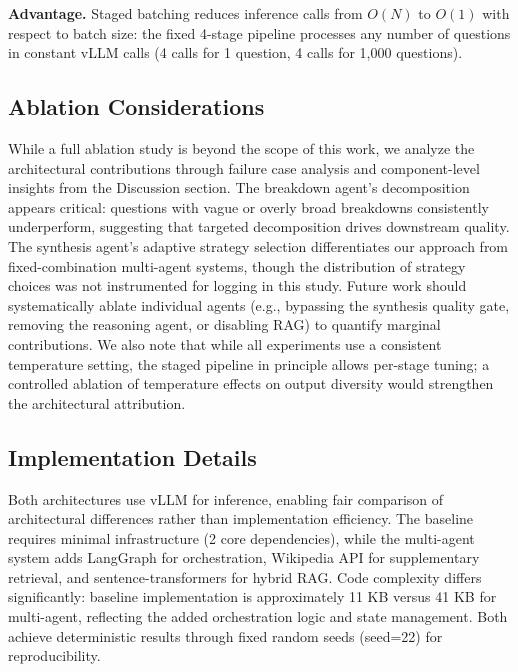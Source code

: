 \textbf{Advantage.} Staged batching reduces inference calls from $O(N)$ to $O(1)$ with respect to batch size: the fixed 4-stage pipeline processes any number of questions in constant vLLM calls (4 calls for 1 question, 4 calls for 1,000 questions).

\subsection{Ablation Considerations}

While a full ablation study is beyond the scope of this work, we analyze the architectural contributions through failure case analysis and component-level insights from the Discussion section. The breakdown agent's decomposition appears critical: questions with vague or overly broad breakdowns consistently underperform, suggesting that targeted decomposition drives downstream quality. The synthesis agent's adaptive strategy selection differentiates our approach from fixed-combination multi-agent systems, though the distribution of strategy choices was not instrumented for logging in this study. Future work should systematically ablate individual agents (e.g., bypassing the synthesis quality gate, removing the reasoning agent, or disabling RAG) to quantify marginal contributions. We also note that while all experiments use a consistent temperature setting, the staged pipeline in principle allows per-stage tuning; a controlled ablation of temperature effects on output diversity would strengthen the architectural attribution.

\subsection{Implementation Details}

Both architectures use vLLM for inference, enabling fair comparison of architectural differences rather than implementation efficiency. The baseline requires minimal infrastructure (2 core dependencies), while the multi-agent system adds LangGraph for orchestration, Wikipedia API for supplementary retrieval, and sentence-transformers for hybrid RAG. Code complexity differs significantly: baseline implementation is approximately 11 KB versus 41 KB for multi-agent, reflecting the added orchestration logic and state management. Both achieve deterministic results through fixed random seeds (seed=22) for reproducibility.
